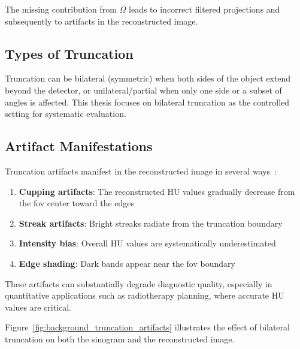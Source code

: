 The missing contribution from $\bar{\Omega}$ leads to incorrect filtered projections and subsequently to artifacts in the reconstructed image.

\subsection{Types of Truncation}

Truncation can be bilateral (symmetric) when both sides of the object extend beyond the detector, or unilateral/partial when only one side or a subset of angles is affected. This thesis focuses on bilateral truncation as the controlled setting for systematic evaluation.

\subsection{Artifact Manifestations}

Truncation artifacts manifest in the reconstructed image in several ways~\cite{hsieh2015computed}:

\begin{enumerate}
    \item \textbf{Cupping artifacts}: The reconstructed HU values gradually decrease from the \gls{fov} center toward the edges
    \item \textbf{Streak artifacts}: Bright streaks radiate from the truncation boundary
    \item \textbf{Intensity bias}: Overall HU values are systematically underestimated
    \item \textbf{Edge shading}: Dark bands appear near the \gls{fov} boundary
\end{enumerate}

These artifacts can substantially degrade diagnostic quality, especially in quantitative applications such as radiotherapy planning, where accurate HU values are critical.

Figure~\ref{fig:background_truncation_artifacts} illustrates the effect of bilateral truncation on both the sinogram and the reconstructed image.

